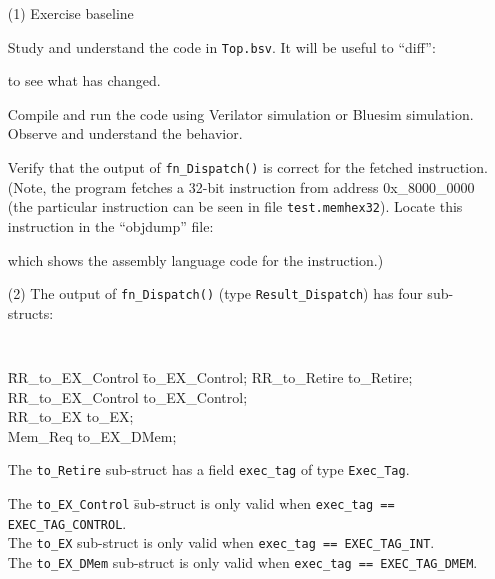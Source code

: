 \begin{itemize}

\item[(1)] Exercise baseline

    Study and understand the code in \verb|Top.bsv|. It will be useful
    to ``diff'':
    to see what has changed.

    Compile and run the code using Verilator simulation or Bluesim
    simulation.  Observe and understand the behavior.

    Verify that the output of \verb|fn_Dispatch()| is correct for the
    fetched instruction.  (Note, the program fetches a 32-bit
    instruction from address 0x\_8000\_0000 (the particular
    instruction can be seen in file \verb|test.memhex32|).  Locate
    this instruction in the ``objdump'' file:


    which shows the assembly language code for the instruction.)

\item[(2)] The output of \verb|fn_Dispatch()| (type
    \verb|Result_Dispatch|) has four sub-structs:
    {\footnotesize\tt
    \begin{tabbing}
    \hm \= RR\_to\_EX\_Control \hm \= to\_EX\_Control; \kill
        \> RR\_to\_Retire          \> to\_Retire; \\
        \> RR\_to\_EX\_Control     \> to\_EX\_Control; \\
        \> RR\_to\_EX              \> to\_EX; \\
        \> Mem\_Req                \> to\_EX\_DMem;
    \end{tabbing}}

    The \verb|to_Retire| sub-struct has a field \verb|exec_tag| of type
    \verb|Exec_Tag|.
    \begin{tabbing}
    The {\tt to\_EX\_Control} \= sub-struct is only valid when {\tt exec\_tag == EXEC\_TAG\_CONTROL}. \\
    The {\tt to\_EX}          \> sub-struct is only valid when {\tt exec\_tag == EXEC\_TAG\_INT}. \\
    The {\tt to\_EX\_DMem}    \> sub-struct is only valid when {\tt exec\_tag == EXEC\_TAG\_DMEM}.
    \end{tabbing}


\end{itemize}

